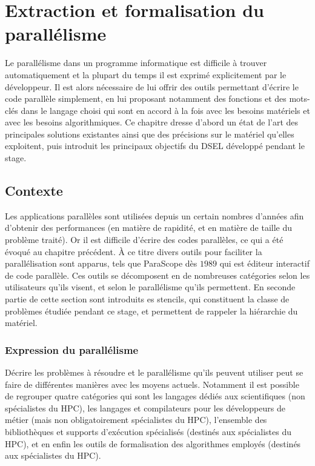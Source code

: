 
\chapter{Extraction et formalisation du parallélisme}

Le parallélisme dans un programme informatique est difficile à trouver automatiquement et la plupart du temps il est exprimé explicitement par le développeur. Il est alors nécessaire de lui offrir des outils permettant d'écrire le code parallèle simplement, en lui proposant notamment des fonctions et des mots-clés dans le langage choisi qui sont en accord à la fois avec les besoins matériels et avec les besoins algorithmiques. Ce chapitre dresse d'abord un état de l'art des principales solutions existantes ainsi que des précisions sur le matériel qu'elles exploitent, puis introduit les principaux objectifs du DSEL développé pendant le stage.

\section{Contexte}

Les applications parallèles sont utilisées depuis un certain nombres d'années afin d'obtenir des performances (en matière de rapidité, et en matière de taille du problème traité). Or il est difficile d'écrire des codes parallèles, ce qui a été évoqué au chapitre précédent. À ce titre divers outils pour faciliter la parallélisation sont apparus, tels que \textsf{ParaScope} dès $1989$ \cite{Art24} qui est éditeur interactif de code parallèle. Ces outils se décomposent en de nombreuses catégories selon les utilisateurs qu'ils visent, et selon le parallélisme qu'ils permettent. En seconde partie de cette section sont introduits es stencils, qui constituent la classe de problèmes étudiée pendant ce stage, et permettent de rappeler la hiérarchie du matériel. 

\subsection{Expression du parallélisme}

Décrire les problèmes à résoudre et le parallélisme qu'ils peuvent utiliser peut se faire de différentes manières avec les moyens actuels. Notamment il est possible de regrouper quatre catégories qui sont les langages dédiés aux scientifiques (non spécialistes du HPC), les langages et compilateurs pour les développeurs de métier (mais non obligatoirement spécialistes du HPC), l'ensemble des bibliothèques et supports d'exécution spécialisés (destinés aux spécialistes du HPC), et en enfin les outils de formalisation des algorithmes employés (destinés aux spécialistes du HPC).

